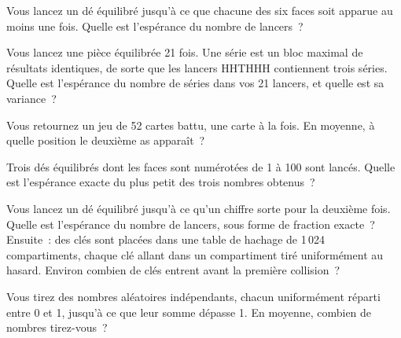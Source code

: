 \begin{question}\label{iq:iv1:expectation-and-indicators:5}
Vous lancez un dé équilibré jusqu'à ce que chacune des six faces soit apparue au moins une fois. Quelle est l'espérance du nombre de
lancers~?
\end{question}

\begin{question}\label{iq:iv1:expectation-and-indicators:6}
Vous lancez une pièce équilibrée 21 fois. Une série est un bloc maximal de résultats identiques, de sorte que les lancers HHTHHH contiennent
trois séries. Quelle est l'espérance du nombre de séries dans vos 21 lancers, et quelle est sa variance~?
\end{question}

\begin{question}\label{iq:iv1:expectation-and-indicators:7}
Vous retournez un jeu de 52 cartes battu, une carte à la fois. En moyenne, à quelle position le deuxième as
apparaît~?
\end{question}

\begin{question}\label{iq:iv1:expectation-and-indicators:8}
Trois dés équilibrés dont les faces sont numérotées de 1 à 100 sont lancés. Quelle est l'espérance exacte du plus petit
des trois nombres obtenus~?
\end{question}

\begin{question}\label{iq:iv1:expectation-and-indicators:9}
Vous lancez un dé équilibré jusqu'à ce qu'un chiffre sorte pour la deuxième fois. Quelle est l'espérance du nombre de lancers, sous forme de
fraction exacte~? Ensuite~: des clés sont placées dans une table de hachage de 1\,024 compartiments, chaque clé allant dans un compartiment
tiré uniformément au hasard. Environ combien de clés entrent avant la première collision~?
\end{question}

\begin{question}\label{iq:iv1:expectation-and-indicators:10}
Vous tirez des nombres aléatoires indépendants, chacun uniformément réparti entre 0 et 1, jusqu'à ce que leur somme dépasse 1. En moyenne, combien
de nombres tirez-vous~?
\end{question}

